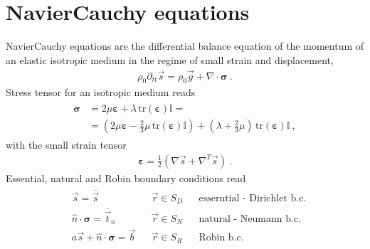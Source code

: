 \documentclass[letterpaper,10pt,english]{jupyterBook}
\begin{document}
\sphinxstepscope


\chapter{Navier\sphinxhyphen{}Cauchy equations}
\label{\detokenize{ch/pde/nc:navier-cauchy-equations}}\label{\detokenize{ch/pde/nc:pde-nc}}\label{\detokenize{ch/pde/nc::doc}}
\sphinxAtStartPar
Navier\sphinxhyphen{}Cauchy equations are the differential balance equation of the momentum of an elastic isotropic medium in the regime of small strain and displacement,
\begin{equation*}
\begin{split}\rho_0 \partial_{tt} \vec{s} = \rho_0 \vec{g} + \nabla \cdot \symbf{\sigma} \ . \end{split}
\end{equation*}
\sphinxAtStartPar
Stress tensor for an isotropic medium reads
\begin{equation*}
\begin{split}\begin{aligned}
  \symbf{\sigma}
   & = 2 \mu \symbf{\varepsilon} + \lambda \, \text{tr} \left( \symbf{\varepsilon} \right) \mathbb{I} = \\
   & = \left( 2 \mu \symbf{\varepsilon} - \frac{2}{3} \mu \, \text{tr}(\symbf{\varepsilon}) \mathbb{I} \right) + \left( \lambda + \frac{2}{3} \mu \right) \, \text{tr} \left( \symbf{\varepsilon} \right) \mathbb{I} \ ,
\end{aligned}\end{split}
\end{equation*}
\sphinxAtStartPar
with the small strain tensor
\begin{equation*}
\begin{split}\symbf{\varepsilon} = \frac{1}{2} \left( \nabla \vec{s} + \nabla^T \vec{s} \right) \ .\end{split}
\end{equation*}
\sphinxAtStartPar
Essential, natural and Robin boundary conditions read
\begin{equation*}
\begin{split}\begin{aligned}
  & \vec{s} = \overline{\vec{s}} && \vec{r} \in S_D && \text{esserntial - Dirichlet b.c.}  \\
  & \hat{n} \cdot \symbf{\sigma} = \overline{\vec{t}}_n && \vec{r} \in S_N && \text{natural - Neumann b.c.}  \\
  & a \vec{s} + \hat{n} \cdot \symbf{\sigma} = \vec{b} && \vec{r} \in S_R && \text{Robin b.c.} \\
\end{aligned}\end{split}
\end{equation*}
\end{document}
